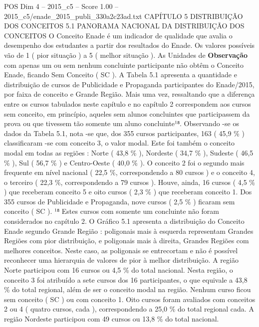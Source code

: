 \begin{textsample}{POS Dim 4 – 2015\_c5 – Score 1.00 – 2015\_c5/enade\_2015\_publi\_330a2c23ad.txt}  \label{ex:f4_pos_167}
CAPÍTULO 5 DISTRIBUIÇÃO DOS CONCEITOS 5.1 PANORAMA NACIONAL DA DISTRIBUIÇÃO DOS CONCEITOS O Conceito Enade é um indicador de qualidade que avalia o desempenho dos estudantes a partir dos resultados do Enade.
Os valores possíveis vão de 1 ( pior situação ) a 5 ( melhor situação ).
As Unidades de \textbf{Observação} com apenas um ou sem nenhum concluinte participante não obtêm o Conceito Enade, ficando Sem Conceito ( SC ).
A Tabela 5.1 apresenta a quantidade e distribuição de cursos de Publicidade e Propaganda participantes do Enade/2015, por faixa de conceito e Grande Região.
Mais uma vez, ressaltando que a diferença entre os cursos tabulados neste capítulo e no capítulo 2 correspondem aos cursos sem conceito, em princípio, aqueles sem alunos concluintes que participassem da prova ou que tivessem tão somente um aluno concluinte¹⁸.
Observando -se os dados da Tabela 5.1, nota -se que, dos 355 cursos participantes, 163 ( 45,9 \% ) classificaram -se com conceito 3, o valor modal.
Este foi também o conceito modal em todas as regiões : Norte ( 43,8 \% ), Nordeste ( 34,7 \% ), Sudeste ( 46,5 \% ), Sul ( 56,7 \% ) e Centro-Oeste ( 40,0 \% ).
O conceito 2 foi o segundo mais frequente em nível nacional ( 22,5 \%, correspondendo a 80 cursos ) e o conceito 4, o terceiro ( 22,3 \%, correspondendo a 79 cursos ).
Houve, ainda, 16 cursos ( 4,5 \% ) que receberam conceito 5 e oito cursos ( 2,3 \% ) que receberam conceito 1.
Dos 355 cursos de Publicidade e Propaganda, nove cursos ( 2,5 \% ) ficaram sem conceito ( SC ). ¹⁸ Estes cursos com somente um concluinte não foram considerados no capítulo 2.
O Gráfico 5.1 apresenta a distribuição do Conceito Enade segundo Grande Região : poligonais mais à esquerda representam Grandes Regiões com pior distribuição, e poligonais mais à direita, Grandes Regiões com melhores conceitos.
Neste caso, as poligonais se entrecortam e não é possível reconhecer uma hierarquia de valores de pior à melhor distribuição.
A região Norte participou com 16 cursos ou 4,5 \% do total nacional.
Nesta região, o conceito 3 foi atribuído a sete cursos dos 16 participantes, o que equivale a 43,8 \% do total regional, além de ser o conceito modal na região.
Nenhum curso ficou sem conceito ( SC ) ou com conceito 1.
Oito cursos foram avaliados com conceitos 2 ou 4 ( quatro cursos, cada ), correspondendo a 25,0 \% do total regional cada.
A região Nordeste participou com 49 cursos ou 13,8 \% do total nacional.

\end{textsample}

